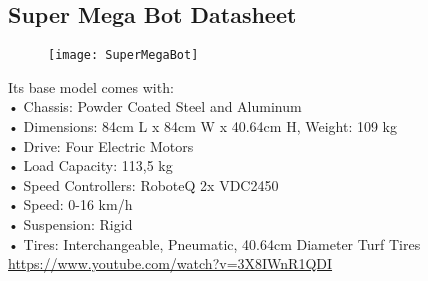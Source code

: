 \begin{appendices}
\chapter{Super Mega Bot Datasheet}
\label{appA}


\begin{figure}[h]
	\begin{center} 
		\texttt{[image: SuperMegaBot]}
		\centering
		\label{fig:SuperMegaBot} 
	\end{center}
\end{figure}


Its base model comes with:\\
•	Chassis: Powder Coated Steel and Aluminum \\
•	Dimensions: 84cm L x 84cm W x 40.64cm H, Weight: 109 kg\\
•	Drive: Four Electric Motors\\
•	Load Capacity: 113,5 kg\\
•	Speed Controllers: RoboteQ 2x VDC2450\\
•	Speed: 0-16 km/h \\
•	Suspension: Rigid\\
•	Tires: Interchangeable, Pneumatic, 40.64cm Diameter Turf Tires\\
\url{https://www.youtube.com/watch?v=3X8IWnR1QDI}



\end{appendices}
